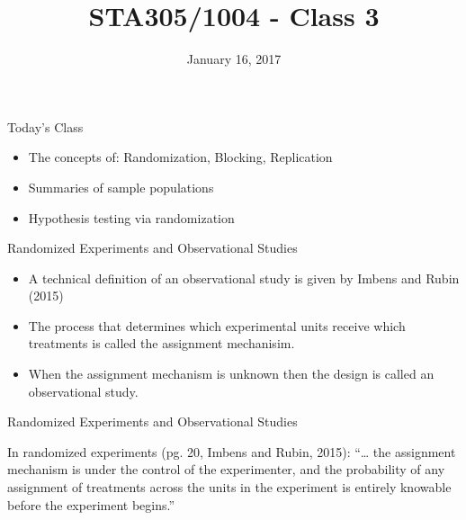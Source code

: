 \documentclass[10pt,ignorenonframetext,]{beamer}
\title{STA305/1004 - Class 3}
\date{January 16, 2017}
\providecommand{\tightlist}{%
\setlength{\itemsep}{0pt}\setlength{\parskip}{0pt}}
\begin{document}
\frame{\titlepage}

\begin{frame}{Today's Class}

\begin{itemize}
\tightlist
\item
  The concepts of: Randomization, Blocking, Replication
\item
  Summaries of sample populations
\item
  Hypothesis testing via randomization
\end{itemize}

\end{frame}

\begin{frame}{Randomized Experiments and Observational Studies}

\begin{itemize}
\tightlist
\item
  A technical definition of an observational study is given by Imbens
  and Rubin (2015)
\item
  The process that determines which experimental units receive which
  treatments is called the assignment mechanisim.
\item
  When the assignment mechanism is unknown then the design is called an
  observational study.
\end{itemize}

\end{frame}

\begin{frame}{Randomized Experiments and Observational Studies}

In randomized experiments (pg. 20, Imbens and Rubin, 2015): ``\ldots{}
the assignment mechanism is under the control of the experimenter, and
the probability of any assignment of treatments across the units in the
experiment is entirely knowable before the experiment begins.''

\end{frame}
\end{document}
